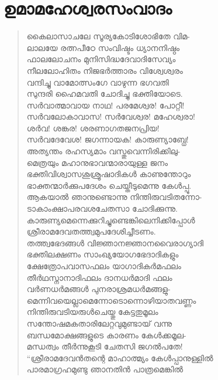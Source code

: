 \section{ഉമാമഹേശ്വരസംവാദം}

\begin{verse}
കൈലാസാചലേ സൂര്യകോടിശോഭിതേ വിമ-\\
ലാലയേ രത്നപീഠേ സംവിഷ്ടം ധ്യാനനിഷ്ഠം\\
ഫാലലോചനം മുനിസിദ്ധദേവാദിസേവ്യം\\
നീലലോഹിതം നിജഭര്‍ത്താരം വിശ്വേശ്വരം\\
വന്ദിച്ചു വാമോത്സംഗേ വാഴുന്ന ഭഗവതി\\
സുന്ദരി ഹൈമവതി ചോദിച്ചു ഭക്തിയോടെ.\\
സര്‍വാത്മാവായ നാഥ! പരമേശ്വര! പോറ്റീ!\\
സര്‍വലോകാവാസ! സര്‍വേശ്വര! മഹേശ്വരാ!\\
ശര്‍വ! ശങ്കര! ശരണാഗതജനപ്രിയ!\\
സര്‍വദേവേശ! ജഗന്നായക! കാരുണ്യാബ്ധേ!\\
അത്യന്തം രഹസ്യമാം വസ്തുവെന്നിരിക്കിലു-\\
മെത്രയും മഹാനുഭാവന്മാരായുള്ള ജനം\\
ഭക്തിവിശ്വാസശുശ്രൂഷാദികള്‍ കാണുന്തോറും\\
ഭാക്തന്മാര്‍ക്കുപദേശം ചെയ്തീടുമെന്നു കേള്‍പ്പൂ.\\
ആകയാല്‍ ഞാനുണ്ടൊന്നു നിന്തിരുവടിതന്നോ-\\
ടാകാംക്ഷാപരവശചേതസാ ചോദിക്കുന്നു.\\
കാരുണ്യമെന്നെക്കുറിച്ചുണ്ടെങ്കിലെനിക്കിപ്പോള്‍\\
ശ്രീരാമദേവതത്ത്വമുപദേശിച്ചീടണം.\\
തത്ത്വഭേദങ്ങള്‍ വിജ്ഞാനജ്ഞാനവൈരാഗ്യാദി\\
ഭക്തിലക്ഷണം സാംഖ്യയോഗഭേദാദികളും\\
ക്ഷേത്രോപവാസഫലം യാഗാദികര്‍മഫലം\\
തീര്‍ഥസ്നാനാദിഫലം ദാനധര്‍മാദി ഫലം\\
വര്‍ണധര്‍മങ്ങള്‍ പുനരാശ്രമധര്‍മങ്ങളു-\\
മെന്നിവയെല്ലാമെന്നോടൊന്നൊഴിയാതവണ്ണം\\
നിന്തിരുവടിയരുള്‍ചെയ്തു കേട്ടതുമൂലം\\
സന്തോഷമകതാരിലേറ്റവുമുണ്ടായ് വന്നു\\
ബന്ധമോക്ഷങ്ങളുടെ കാരണം കേള്‍ക്കമൂല-\\
മന്ധത്വം തീര്‍ന്നുകൂടി ചേതസി ജഗല്‍പതേ!\\
“ശ്രീരാമദേവന്‍തന്റെ മാഹാത്മ്യം കേള്‍പ്പാനുള്ളില്‍\\
പാരമാഗ്രഹമുണ്ടു ഞാനതിന്‍ പാത്രമെങ്കില്‍\\

\end{verse}
